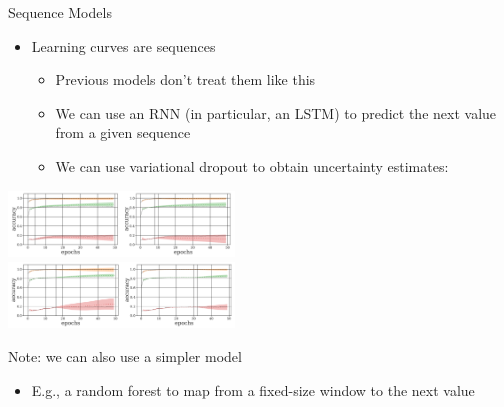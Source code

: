 \begin{frame}{Sequence Models {} }

	\begin{itemize}
		\item Learning curves are \alert{sequences}
		\begin{itemize}
			\item Previous models don't treat them like this
			\item We can use an RNN (in particular, an LSTM) to predict the next value from a given sequence
			\item We can use variational dropout to obtain uncertainty estimates:
\pause
		\end{itemize}
	\end{itemize}

\begin{center}
	\includegraphics[width=0.45\textwidth]{../w07_hpo_speedup/images/learningcurve/Gargiani-MNIST-extrapolations_1.png}\\
	\includegraphics[width=0.45\textwidth]{../w07_hpo_speedup/images/learningcurve/Gargiani-MNIST-extrapolations_2.png}\\
\end{center}	

\pause
	Note: we can also use a simpler model
	\begin{itemize}
		\item E.g., a random forest to map from a fixed-size window to the next value
	\end{itemize}

	
\end{frame}
%
